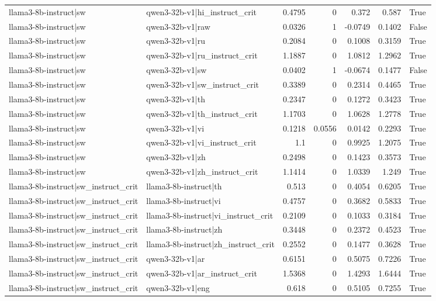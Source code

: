 \begin{table}
\begin{tabular}{l l r r r r l}
llama3-8b-instruct|sw & qwen3-32b-v1|hi_instruct_crit & 0.4795 & 0 & 0.372 & 0.587 & True \\
llama3-8b-instruct|sw & qwen3-32b-v1|raw & 0.0326 & 1 & -0.0749 & 0.1402 & False \\
llama3-8b-instruct|sw & qwen3-32b-v1|ru & 0.2084 & 0 & 0.1008 & 0.3159 & True \\
llama3-8b-instruct|sw & qwen3-32b-v1|ru_instruct_crit & 1.1887 & 0 & 1.0812 & 1.2962 & True \\
llama3-8b-instruct|sw & qwen3-32b-v1|sw & 0.0402 & 1 & -0.0674 & 0.1477 & False \\
llama3-8b-instruct|sw & qwen3-32b-v1|sw_instruct_crit & 0.3389 & 0 & 0.2314 & 0.4465 & True \\
llama3-8b-instruct|sw & qwen3-32b-v1|th & 0.2347 & 0 & 0.1272 & 0.3423 & True \\
llama3-8b-instruct|sw & qwen3-32b-v1|th_instruct_crit & 1.1703 & 0 & 1.0628 & 1.2778 & True \\
llama3-8b-instruct|sw & qwen3-32b-v1|vi & 0.1218 & 0.0556 & 0.0142 & 0.2293 & True \\
llama3-8b-instruct|sw & qwen3-32b-v1|vi_instruct_crit & 1.1 & 0 & 0.9925 & 1.2075 & True \\
llama3-8b-instruct|sw & qwen3-32b-v1|zh & 0.2498 & 0 & 0.1423 & 0.3573 & True \\
llama3-8b-instruct|sw & qwen3-32b-v1|zh_instruct_crit & 1.1414 & 0 & 1.0339 & 1.249 & True \\
llama3-8b-instruct|sw_instruct_crit & llama3-8b-instruct|th & 0.513 & 0 & 0.4054 & 0.6205 & True \\
llama3-8b-instruct|sw_instruct_crit & llama3-8b-instruct|vi & 0.4757 & 0 & 0.3682 & 0.5833 & True \\
llama3-8b-instruct|sw_instruct_crit & llama3-8b-instruct|vi_instruct_crit & 0.2109 & 0 & 0.1033 & 0.3184 & True \\
llama3-8b-instruct|sw_instruct_crit & llama3-8b-instruct|zh & 0.3448 & 0 & 0.2372 & 0.4523 & True \\
llama3-8b-instruct|sw_instruct_crit & llama3-8b-instruct|zh_instruct_crit & 0.2552 & 0 & 0.1477 & 0.3628 & True \\
llama3-8b-instruct|sw_instruct_crit & qwen3-32b-v1|ar & 0.6151 & 0 & 0.5075 & 0.7226 & True \\
llama3-8b-instruct|sw_instruct_crit & qwen3-32b-v1|ar_instruct_crit & 1.5368 & 0 & 1.4293 & 1.6444 & True \\
llama3-8b-instruct|sw_instruct_crit & qwen3-32b-v1|eng & 0.618 & 0 & 0.5105 & 0.7255 & True \\

\end{tabular}
\end{table}
